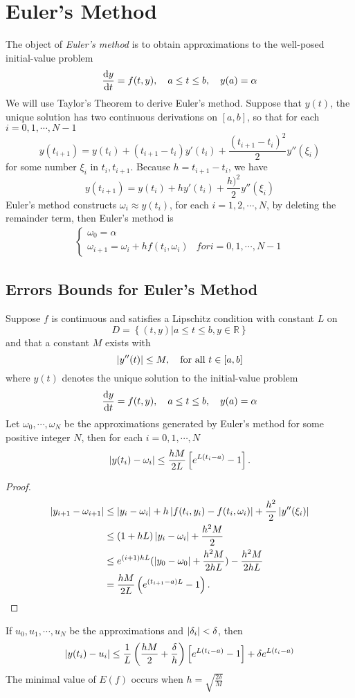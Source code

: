 \section{Euler's Method}
The object of \emph{Euler's method} is to obtain approximations to the well-posed initial-value problem
\[
\frac{\mathrm{d} y}{\mathrm{d} t}=f(t,y),\quad a\leq t\leq b,\quad y(a)=\alpha
\]
We will use Taylor's Theorem to derive Euler's method. Suppose that $y(t)$, the unique solution has two continuous derivations on $[a,b]$, so that for each $i=0,1,\cdots,N-1$
\[
y(t_{i+1})=y(t_i)+(t_{i+1}-t_i)y'(t_i)+\frac{(t_{i+1}-t_i)^2}{2}y''(\xi_i)
\]
for some number $\xi_i$ in $t_i,t_{i+1}$. Because $h=t_{i+1}-t_i$, we have
\[
y(t_{i+1})=y(t_i)+hy'(t_i)+\frac{h)^2}{2}y''(\xi_i)
\]
Euler's method constructs $\omega_i\approx y(t_i)$, for each $i=1,2,\cdots,N$, by deleting the remainder term, then Euler's method is
\begin{align*}
  \begin{cases}
    \omega_0=\alpha & \\
    \omega_{i+1}=\omega_i+hf(t_i,\omega_i) & for i=0,1,\cdots,N-1
  \end{cases}
\end{align*}
\subsection{Errors Bounds for Euler's Method}
\begin{theo}
Suppose $f$ is continuous and satisfies a Lipschitz condition with constant $L$ on
\[
D=\left\{(t,y)|a\leq t\leq b,y\in\mathbb{R}\right\}
\]
and that a constant $M$ exists with
\[
\left|y''(t)\right|\leq M,\quad \text{for all $t\in [a,b]$}
\]
where $y(t)$ denotes the unique solution to the initial-value problem
\[
\frac{\mathrm{d} y}{\mathrm{d} t}=f(t,y),\quad a\leq t\leq b,\quad y(a)=\alpha
\]
Let $\omega_0,\cdots,\omega_N$ be the approximations generated by Euler's method for some positive integer $N$, then for each $i=0,1,\cdots,N$
\[
\left|y(t_i)-\omega_i\right|\leq \frac{hM}{2L}\left[e^{L(t_i-a)}-1\right].
\]
\end{theo}
\begin{proof}
\begin{align*}
  \left|y_{i+1}-\omega_{i+1}\right| &\leq \left|y_i-\omega_i\right|+h\left|f(t_i,y_i)-f(t_i,\omega_i)\right|+\frac{h^2}{2}\left|y''(\xi_i)\right| \\
  &\leq (1+hL)\left|y_i-\omega_i\right|+\frac{h^2M}{2} \\
  &\leq e^{(i+1)hL}(\left|y_0-\omega_0\right|+\frac{h^2M}{2hL})-\frac{h^2M}{2hL} \\
  &= \frac{hM}{2L}\left(e^{(t_{i+1}-a)L}-1\right).
\end{align*}
\end{proof} 
\begin{theo}
If $u_0,u_1,\cdots,u_N$ be the approximations and $\left|\delta_i\right|<\delta$, then
\[
\left|y(t_i)-u_i\right|\leq\frac{1}{L}\left(\frac{hM}{2}+\frac{\delta}{h}\right)\left[e^{L(t_i-a)}-1\right]+\delta e^{L(t_i-a)}
\]
The minimal value of $E(f)$ occurs when $h=\sqrt{\frac{2\delta}{M}}$
\end{theo}